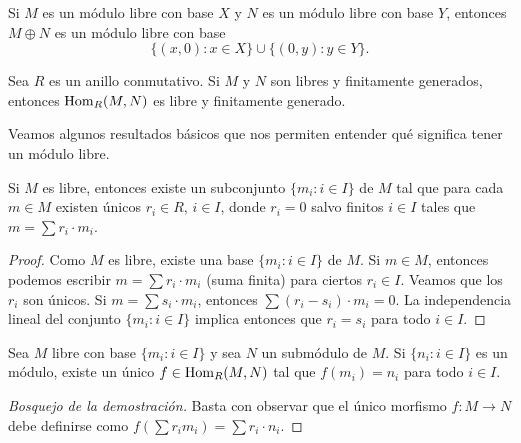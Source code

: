 \begin{example}
Si $M$ es un módulo libre con base $X$ y $N$ es un módulo libre con base $Y$, entonces
$M\oplus N$ es un módulo libre con base 
\[
\{(x,0):x\in X\}\cup \{(0,y):y\in Y\}.
\]	
\end{example}

\begin{exercise}
Sea $R$ es un anillo conmutativo. Si $M$ y $N$ son libres y finitamente generados, entonces
$\operatorname{Hom}_R(M,N)$ es libre y finitamente generado.	
\end{exercise}

Veamos algunos resultados básicos que nos permiten entender qué significa tener un módulo libre. 

\begin{proposition}
Si $M$ es libre, entonces existe un subconjunto $\{m_i:i\in I\}$ de $M$ tal que 
para cada $m\in M$ existen únicos $r_i\in R$, $i\in I$, 
donde $r_i=0$ salvo finitos $i\in I$ 
tales que $m=\sum r_i\cdot m_i$. 
\end{proposition}

\begin{proof}
Como $M$ es libre, existe una base $\{m_i:i\in I\}$ de $M$. Si $m\in M$, entonces
podemos escribir $m=\sum r_i\cdot m_i$ (suma finita) para ciertos $r_i\in I$. Veamos que los $r_i$ son únicos. Si $m=\sum s_i\cdot m_i$, entonces
$\sum (r_i-s_i)\cdot m_i=0$. La independencia lineal del conjunto $\{m_i:i\in I\}$ implica entonces que $r_i=s_i$ para todo $i\in I$.  	
\end{proof}

\begin{proposition}
\label{pro:libre}
Sea $M$ libre con base $\{m_i:i\in I\}$ y sea $N$ un submódulo de $M$. Si $\{n_i:i\in I\}$ es un módulo, existe
un único $f\in\operatorname{Hom}_R(M,N)$ tal que $f(m_i)=n_i$ para todo $i\in I$.  
\end{proposition}

\begin{proof}[Bosquejo de la demostración]
Basta con observar que el único morfismo $f\colon M\to N$ debe definirse como $f(\sum r_im_i)=\sum r_i\cdot n_i$.  	
\end{proof}

